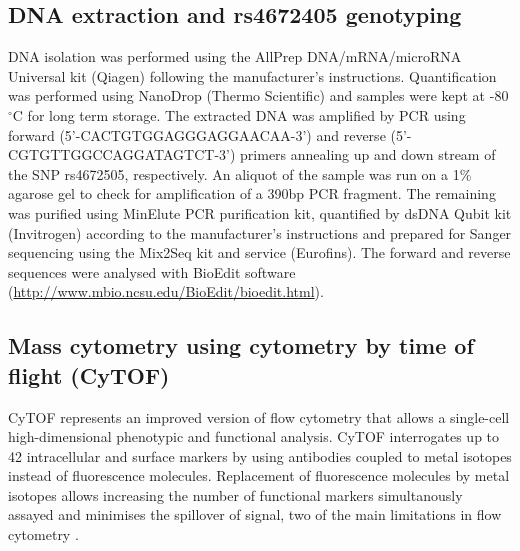 \subsection{DNA extraction and rs4672405 genotyping}
DNA isolation was performed using the AllPrep DNA/mRNA/microRNA Universal kit (Qiagen) following the manufacturer's instructions. Quantification was performed using NanoDrop (Thermo Scientific) and samples were kept at -80{$^\circ$}C for long term storage. The extracted DNA was amplified by PCR using forward (5'-CACTGTGGAGGGAGGAACAA-3') and reverse (5'-CGTGTTGGCCAGGATAGTCT-3') primers annealing up and down stream of the SNP rs4672505, respectively. An aliquot of the sample was run on a 1\% agarose gel to check for amplification of a 390bp PCR fragment. The remaining was purified using MinElute PCR purification kit, quantified by dsDNA Qubit kit (Invitrogen) according to the manufacturer's instructions and prepared for Sanger sequencing using the Mix2Seq kit and service (Eurofins). The forward and reverse sequences were analysed with BioEdit software (\url{http://www.mbio.ncsu.edu/BioEdit/bioedit.html}).



\subsection{Mass cytometry using cytometry by time of flight (CyTOF)}
CyTOF represents an improved version of flow cytometry that allows a single-cell high-dimensional phenotypic and functional analysis. CyTOF interrogates up to 42 intracellular and surface markers by using antibodies coupled to metal isotopes instead of fluorescence molecules. Replacement of fluorescence molecules by metal isotopes allows increasing the number of functional markers simultanously assayed and minimises the spillover of signal, two of the main limitations in flow cytometry \parencite{Yao2014}.

